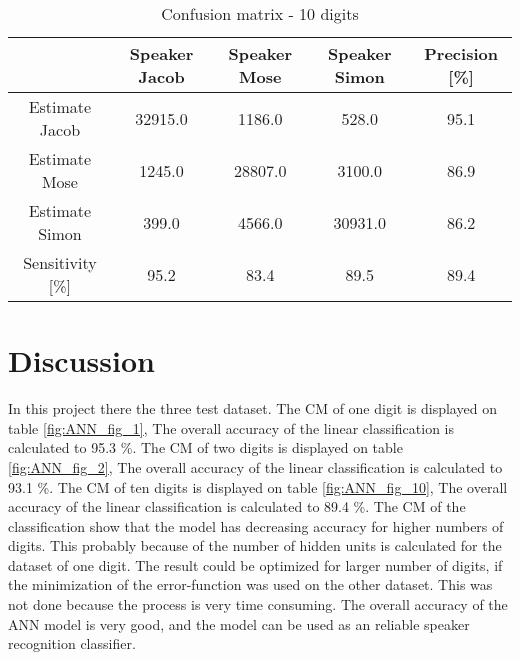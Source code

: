 \begin{table}[H]                                                    
\centering                                                          
\begin{tabular}{|c|c|c|c|c|}                                        
\hline                                                              
  & Speaker Jacob & Speaker Mose & Speaker Simon & Precision [\%] \\
\hline                                                              
Estimate Jacob & 32915.0 & 1186.0 & 528.0 & 95.1 \\                 
\hline                                                              
Estimate Mose & 1245.0 & 28807.0 & 3100.0 & 86.9 \\                 
\hline                                                              
Estimate Simon & 399.0 & 4566.0 & 30931.0 & 86.2 \\                 
\hline                                                              
Sensitivity [\%] & 95.2 & 83.4 & 89.5 & 89.4 \\                     
\hline                                                              
\end{tabular}                                                       
\caption{Confusion matrix - 10 digits}                              
\label{table:ANN_conf_10}                                           
\end{table}


\section{Discussion}
In this project there the three test dataset.
The CM of one digit is displayed on table \ref{fig:ANN_fig_1}, The overall accuracy of the linear classification is  calculated to 95.3 \%.
The CM of two digits is displayed on table \ref{fig:ANN_fig_2}, The overall accuracy of the linear classification is  calculated to 93.1 \%.
The CM of ten digits is displayed on table \ref{fig:ANN_fig_10}, The overall accuracy of the linear classification is  calculated to 89.4 \%.
The CM of the classification show that the model has decreasing accuracy for higher numbers of digits.
This probably because of the number of hidden units is calculated for the dataset of one digit.
The result could be optimized for larger number of digits, if the minimization of the  error-function was used on the other dataset.
This was not done because the process is very time consuming. 
The overall accuracy of the ANN model is very good, and the model can be used as an reliable speaker recognition classifier.    
